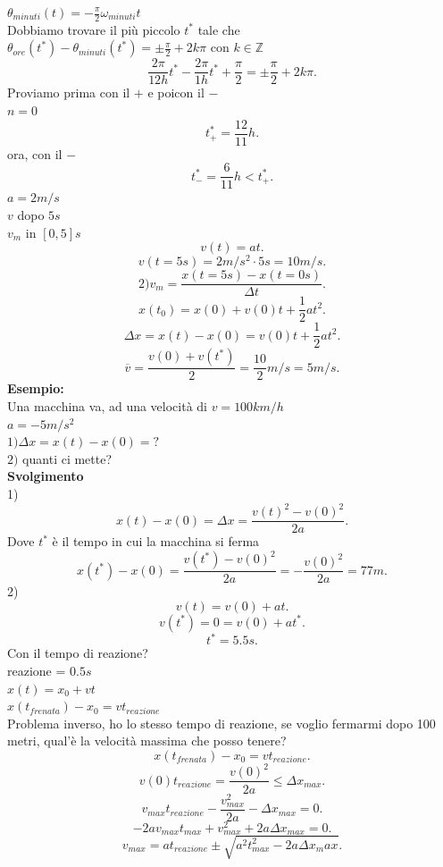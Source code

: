 \documentclass[12px]{article}
\begin{document}
$\theta_{minuti}(t) = - \frac \pi 2 \omega_{minuti}t$\\
Dobbiamo trovare il più piccolo $t^*$ tale che\\
$\theta_{ore}(t^*)-\theta_{minuti}(t^*) = \pm \frac \pi 2 + 2k\pi$ con  $k\in \mathbb Z$\\
 \[
	 \frac {2\pi} {12 h} t^* - \frac {2\pi}{1 h} t^* + \frac \pi 2 = \pm \frac \pi 2 + 2 k\pi
.\] 
Proviamo prima con il $+$ e poicon il  $-$ \\
$n=0$
 \[
	 t^*_+ = \frac {12}{11} h
.\] 
ora, con il $-$\\
 \[
	 t^*_- = \frac {6}{11} h < t^*_+
.\] 
$a = 2 m/s$\\
 $v$ dopo $5s$\\
 $v_m$ in $[0,5]s$
  \[
 v(t) = at
 .\] 
 \[
 v(t=5s) = 2 m/s^2 \cdot 5 s = 10m/s
 .\] 
 \[
	 2) v_m = \frac{x(t=5s) - x(t=0s)}{\Delta t}
 .\]
 \[
x(t_0) = x(0) + v(0)t + \frac 12 at^2
 .\] 
 \[
 \Delta x = x(t) - x(0) = v(0)t + \frac 12 at^2
 .\] 
 \[
	 \overline v = \frac{v(0) + v(t^*)} 2 = \frac {10} 2  m/s = 5m/s
 
 .\] 
 \textbf{Esempio:}\\
 Una macchina va, ad una velocità di $v = 100 km/h$\\
  $a = -5 m/s^2$\\
  $1)\Delta x = x(t) - x(0) = ?$\\
   $2)$ quanti ci mette?\\
   \textbf{Svolgimento}\\
   1)
   \[
	   x(t) - x(0) = \Delta x = \frac{v(t)^2- v(0)^2}{2a}
   .\] 
   Dove $t^*$ è il tempo in cui la macchina si ferma
   \[
	   x(t^*) - x(0) = \frac{v(t^*) - v(0)^2}{2a} = - \frac{v(0)^2}{2a} = 77 m
   .\] 
   2)
   \[
   v(t) = v(0) + at
   .\] 
   \[
   v(t^*) = 0 = v(0)+ at^*
   .\] 
   \[
	   t^* = 5.5 s
   .\] 
Con il tempo di reazione?\\
reazione = $0.5s$\\
$x(t) = x_0 + vt$\\
$x(t_{frenata}) - x_0 = vt_{reazione}$ \\
Problema inverso, ho lo stesso tempo di reazione, se voglio fermarmi dopo 100 metri, qual'è la velocità massima che posso tenere?\\
\[
	x(t_{frenata}) - x_0 = vt_{reazione}
.\] 
\[
	v(0)t_{reazione} = \frac{v(0)^2}{2a}\leq\Delta x_{max}
.\] 
\[
	v_{max}t_{reazione} - \frac{v_{max}^2}{2a} - \Delta x_{max} = 0
.\] 
\[
	-2av_{max}t_{max} + v_{max}^2 + 2a\Delta x_{max}=0
.\] 
\[
	v_{max} = at_{reazione}\pm\sqrt{a^2t_{max}^2-2a\Delta x_max}
.\] 
\end{document}
